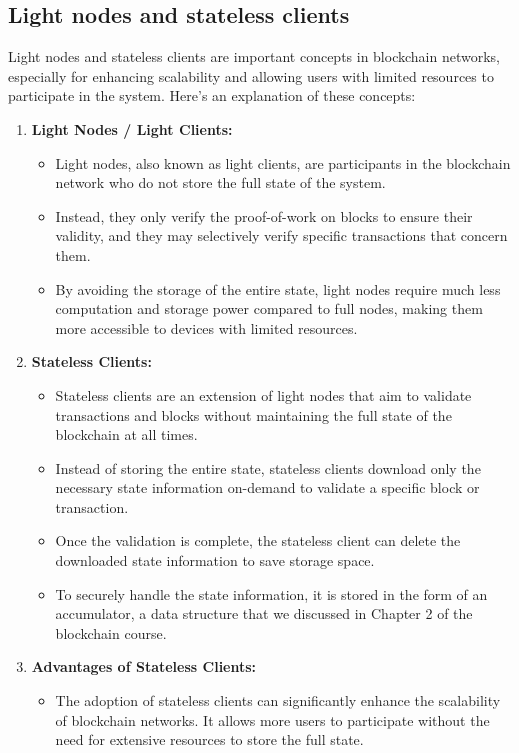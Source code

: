 \subsection{Light nodes and stateless clients}
Light nodes and stateless clients are important concepts in blockchain networks, especially for enhancing scalability and allowing users with limited resources to participate in the system. Here's an explanation of these concepts:
\begin{enumerate}
	\item \textbf{Light Nodes / Light Clients:}
	\begin{itemize}
		\item Light nodes, also known as light clients, are participants in the blockchain network who do not store the full state of the system.
		\item Instead, they only verify the proof-of-work on blocks to ensure their validity, and they may selectively verify specific transactions that concern them.
		\item By avoiding the storage of the entire state, light nodes require much less computation and storage power compared to full nodes, making them more accessible to devices with limited resources.
	\end{itemize}
	\item \textbf{Stateless Clients:}
	\begin{itemize}
		\item Stateless clients are an extension of light nodes that aim to validate transactions and blocks without maintaining the full state of the blockchain at all times.
		\item Instead of storing the entire state, stateless clients download only the necessary state information on-demand to validate a specific block or transaction.
		\item Once the validation is complete, the stateless client can delete the downloaded state information to save storage space.
		\item To securely handle the state information, it is stored in the form of an accumulator, a data structure that we discussed in Chapter 2 of the blockchain course.
	\end{itemize}
	\item \textbf{Advantages of Stateless Clients:}
	\begin{itemize}
		\item The adoption of stateless clients can significantly enhance the scalability of blockchain networks. It allows more users to participate without the need for extensive resources to store the full state.

\end{itemize}
\end{enumerate}
